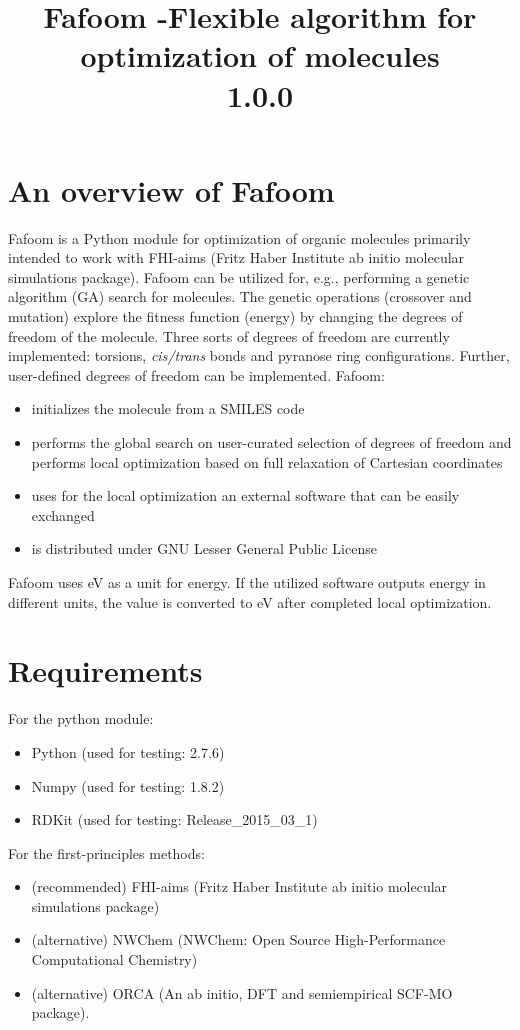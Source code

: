 \documentclass[a4paper]{article}
\title{Fafoom -Flexible algorithm for optimization of molecules \\ 1.0.0}
\begin{document}
\maketitle

\tableofcontents
\newpage

\section{An overview of Fafoom}

Fafoom is a Python module for optimization of organic molecules primarily intended to work with FHI-aims (Fritz Haber Institute ab initio molecular simulations package). 
Fafoom can be utilized for, e.g., performing  a genetic algorithm (GA) search for molecules. The genetic operations (crossover and mutation) explore the fitness function (energy) by changing the degrees of freedom of the molecule. Three sorts of degrees of freedom are currently implemented: torsions, \textit{cis/trans} bonds and pyranose ring configurations. Further, user-defined degrees of freedom can be implemented. Fafoom:
\begin{itemize}
\item initializes the molecule from a SMILES code
\item performs the global search on user-curated selection of degrees of freedom and performs local optimization based on full relaxation of Cartesian coordinates
\item uses for the local optimization an external software that can be easily exchanged
\item is distributed under GNU Lesser General Public License 
\end{itemize}

Fafoom uses eV as a unit for energy. If the utilized software outputs energy in different units, the value is converted to eV after completed local optimization.

\section{Requirements}

For the python module:
\begin{itemize}
\item Python (used for testing: 2.7.6)
\item Numpy (used for testing: 1.8.2)
\item RDKit (used for testing: Release\_2015\_03\_1)
\end{itemize} 
For the first-principles methods:
\begin{itemize}
\item (recommended) FHI-aims (Fritz Haber Institute ab initio molecular simulations package)
\item (alternative) NWChem (NWChem: Open Source High-Performance Computational Chemistry)
\item (alternative) ORCA (An ab initio, DFT and semiempirical SCF-MO package). 

\end{itemize} 
\end{document}
